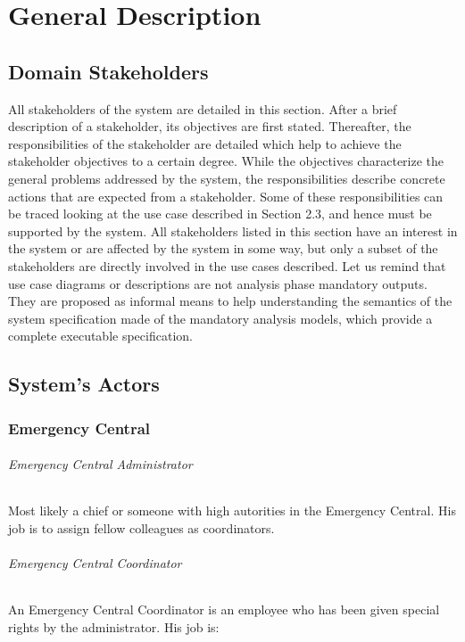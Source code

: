 
\chapter{General Description}
\label{chap:general_description}


\section{Domain Stakeholders}
\label{sec:icrash-gendescr-stakeholders}
All stakeholders of the system are detailed in this section. After a brief description of a
stakeholder, its objectives are first stated. Thereafter, the responsibilities of
the stakeholder are detailed which help to achieve the stakeholder objectives to a certain
degree. While the objectives characterize the general problems addressed by the \msricrashmini system,
the responsibilities describe concrete actions that are expected from a stakeholder. Some of
these responsibilities can be traced looking at the use case described in
Section 2.3, and hence must be supported by the \msricrashmini  system. 
All stakeholders listed in this section have an interest in the system or are affected
by the system in some way, but only a subset of the stakeholders are directly involved in the use
cases described.
Let us remind that use case diagrams or descriptions are not \msrmessir analysis phase mandatory outputs. They are proposed as informal means to help understanding the semantics of the system specification made of the mandatory analysis models, which provide a complete executable specification.

\newpage

\section{System's Actors}
\label{sec:icrash-gendescr-actors}
\subsection{Emergency Central}
\subparagraph{Emergency Central Administrator}
Most likely a chief or someone with high autorities in the Emergency Central. His
job is to assign fellow colleagues as coordinators.

\subparagraph{Emergency Central Coordinator}
An Emergency Central Coordinator is an employee who has been given special rights
by the administrator. His job is:

